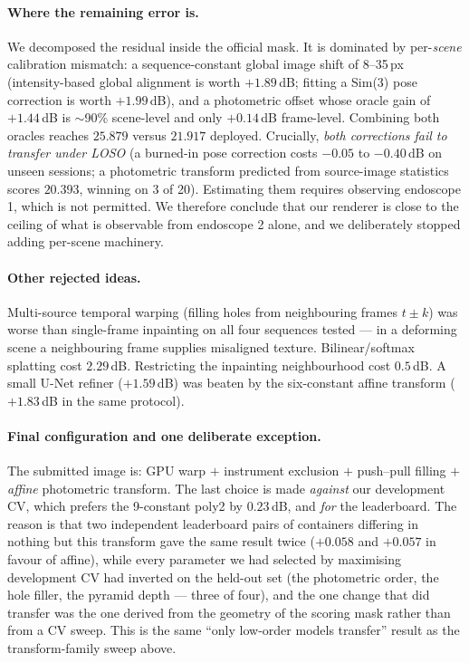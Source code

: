 \paragraph{Where the remaining error is.} We decomposed the residual inside the official mask. It is
dominated by per-\emph{scene} calibration mismatch: a sequence-constant global image shift of 8--35\,px
(intensity-based global alignment is worth $+1.89$\,dB; fitting a Sim(3) pose correction is worth
$+1.99$\,dB), and a photometric offset whose oracle gain of $+1.44$\,dB is $\sim$90\% scene-level and only
$+0.14$\,dB frame-level. Combining both oracles reaches $25.879$ versus $21.917$ deployed. Crucially,
\emph{both corrections fail to transfer under LOSO} (a burned-in pose correction costs $-0.05$ to
$-0.40$\,dB on unseen sessions; a photometric transform predicted from source-image statistics scores
$20.393$, winning on 3 of 20). Estimating them requires observing endoscope 1, which is not permitted.
We therefore conclude that our renderer is close to the ceiling of what is observable from endoscope 2
alone, and we deliberately stopped adding per-scene machinery.

\paragraph{Other rejected ideas.} Multi-source temporal warping (filling holes from neighbouring frames
$t\pm k$) was worse than single-frame inpainting on all four sequences tested --- in a deforming scene a
neighbouring frame supplies misaligned texture. Bilinear/softmax splatting cost $2.29$\,dB. Restricting
the inpainting neighbourhood cost $0.5$\,dB. A small U-Net refiner ($+1.59$\,dB) was beaten by the
six-constant affine transform ($+1.83$\,dB in the same protocol).

\paragraph{Final configuration and one deliberate exception.} The submitted image is: GPU warp $+$
instrument exclusion $+$ push--pull filling $+$ \emph{affine} photometric transform. The last choice is
made \emph{against} our development CV, which prefers the 9-constant poly2 by $0.23$\,dB, and \emph{for}
the leaderboard. The reason is that two independent leaderboard pairs of containers differing in nothing
but this transform gave the same result twice ($+0.058$ and $+0.057$ in favour of affine), while every
parameter we had selected by maximising development CV had inverted on the held-out set (the photometric
order, the hole filler, the pyramid depth --- three of four), and the one change that did transfer was the
one derived from the geometry of the scoring mask rather than from a CV sweep. This is the same
``only low-order models transfer'' result as the transform-family sweep above.

